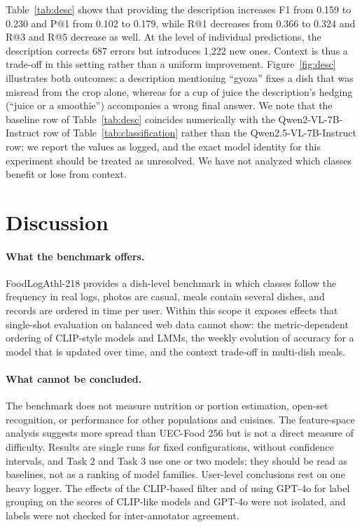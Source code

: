 \documentclass[sigconf, nonacm]{acmart}
\begin{document}
Table~\ref{tab:desc} shows that providing the description increases F1 from 0.159 to 0.230 and P@1 from 0.102 to 0.179, while R@1 decreases from 0.366 to 0.324 and R@3 and R@5 decrease as well. At the level of individual predictions, the description corrects 687 errors but introduces 1,222 new ones. Context is thus a trade-off in this setting rather than a uniform improvement. Figure~\ref{fig:desc} illustrates both outcomes: a description mentioning ``gyoza'' fixes a dish that was misread from the crop alone, whereas for a cup of juice the description's hedging (``juice or a smoothie'') accompanies a wrong final answer. We note that the baseline row of Table~\ref{tab:desc} coincides numerically with the Qwen2-VL-7B-Instruct row of Table~\ref{tab:classification} rather than the Qwen2.5-VL-7B-Instruct row; we report the values as logged, and the exact model identity for this experiment should be treated as unresolved. We have not analyzed which classes benefit or lose from context.

\section{Discussion}
\paragraph{What the benchmark offers.} FoodLogAthl-218 provides a dish-level benchmark in which classes follow the frequency in real logs, photos are casual, meals contain several dishes, and records are ordered in time per user. Within this scope it exposes effects that single-shot evaluation on balanced web data cannot show: the metric-dependent ordering of CLIP-style models and LMMs, the weekly evolution of accuracy for a model that is updated over time, and the context trade-off in multi-dish meals.

\paragraph{What cannot be concluded.} The benchmark does not measure nutrition or portion estimation, open-set recognition, or performance for other populations and cuisines. The feature-space analysis suggests more spread than UEC-Food 256 but is not a direct measure of difficulty. Results are single runs for fixed configurations, without confidence intervals, and Task 2 and Task 3 use one or two models; they should be read as baselines, not as a ranking of model families. User-level conclusions rest on one heavy logger. The effects of the CLIP-based filter and of using GPT-4o for label grouping on the scores of CLIP-like models and GPT-4o were not isolated, and labels were not checked for inter-annotator agreement.
\end{document}
